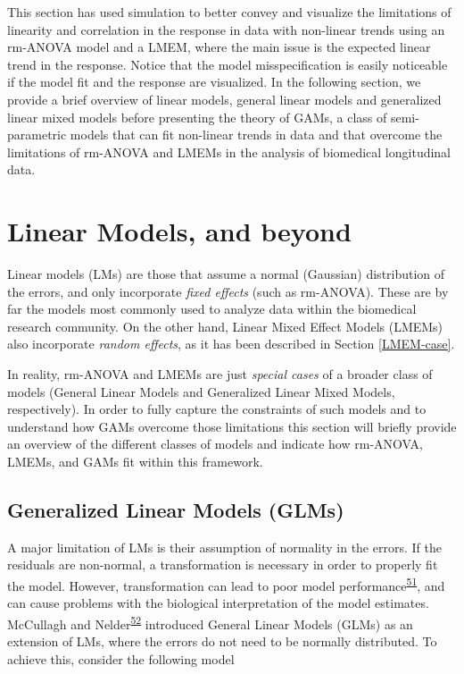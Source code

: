 \documentclass[
]{article}
\begin{document}
This section has used simulation to better convey and visualize the limitations of linearity and correlation in the response in data with non-linear trends using an rm-ANOVA model and a LMEM, where the main issue is the expected linear trend in the response. Notice that the model misspecification is easily noticeable if the model fit and the response are visualized. In the following section, we provide a brief overview of linear models, general linear models and generalized linear mixed models before presenting the theory of GAMs, a class of semi-parametric models that can fit non-linear trends in data and that overcome the limitations of rm-ANOVA and LMEMs in the analysis of biomedical longitudinal data.

\hypertarget{linear-models-and-beyond}{%
\section{Linear Models, and beyond}\label{linear-models-and-beyond}}

Linear models (LMs) are those that assume a normal (Gaussian) distribution of the errors, and only incorporate \emph{fixed effects} (such as rm-ANOVA). These are by far the models most commonly used to analyze data within the biomedical research community. On the other hand, Linear Mixed Effect Models (LMEMs) also incorporate \emph{random effects}, as it has been described in Section \ref{LMEM-case}.

In reality, rm-ANOVA and LMEMs are just \emph{special cases} of a broader class of models (General Linear Models and Generalized Linear Mixed Models, respectively). In order to fully capture the constraints of such models and to understand how GAMs overcome those limitations this section will briefly provide an overview of the different classes of models and indicate how rm-ANOVA, LMEMs, and GAMs fit within this framework.

\hypertarget{generalized-linear-models-glms}{%
\subsection{Generalized Linear Models (GLMs)}\label{generalized-linear-models-glms}}

A major limitation of LMs is their assumption of normality in the errors. If the residuals are non-normal, a transformation is necessary in order to properly fit the model. However, transformation can lead to poor model performance\textsuperscript{\protect\hyperlink{ref-ohara2010}{51}}, and can cause problems with the biological interpretation of the model estimates. McCullagh and Nelder\textsuperscript{\protect\hyperlink{ref-nelder1972}{52}} introduced General Linear Models (GLMs) as an extension of LMs, where the errors do not need to be normally distributed. To achieve this, consider the following model
\end{document}

